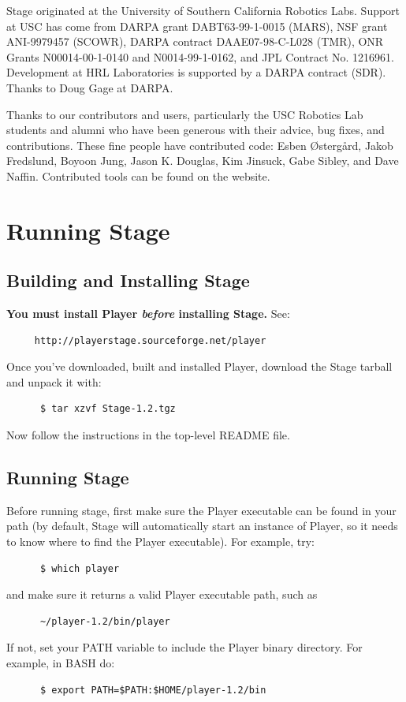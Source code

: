 \documentclass[11pt,twoside]{report}
\begin{document}
Stage originated at the University of Southern California Robotics
    Labs. Support at USC has come from DARPA grant DABT63-99-1-0015
    (MARS), NSF grant ANI-9979457 (SCOWR), DARPA contract
    DAAE07-98-C-L028 (TMR), ONR Grants N00014-00-1-0140 and
    N0014-99-1-0162, and JPL Contract No. 1216961. Development at HRL
    Laboratories is supported by a DARPA contract (SDR). Thanks to
    Doug Gage at DARPA.

Thanks to our contributors and users, particularly the USC Robotics
Lab students and alumni who have been generous with their advice, bug
fixes, and contributions. These fine people have contributed code:
Esben \O{}sterg\aa{}rd, Jakob Fredslund, Boyoon Jung, Jason
K. Douglas, Kim Jinsuck, Gabe Sibley, and Dave Naffin. Contributed
tools can be found on the website.

\chapter{Running Stage}
  \section{Building and Installing Stage}

    {\bf You must install Player {\sl before} installing Stage.} 
    See:
	\begin{verbatim}
	 http://playerstage.sourceforge.net/player
	\end{verbatim}

    \noindent Once you've downloaded, built and installed Player, download
    the Stage tarball and unpack it with:
      \begin{verbatim}
      $ tar xzvf Stage-1.2.tgz
      \end{verbatim}
    Now follow the instructions in the top-level README file.

  \section{Running Stage}

    Before running stage, first make sure the Player executable can be
    found in your path (by default, Stage will automatically start an instance of Player, so it needs to know where to find the Player executable).
    For example, try:
      \begin{verbatim}
      $ which player
      \end{verbatim}
    and make sure it returns a valid Player executable path, such as
      \begin{verbatim}
      ~/player-1.2/bin/player
      \end{verbatim}
    If not, set your PATH variable to include the Player binary directory. 
    For example, in BASH do:
      \begin{verbatim}  
      $ export PATH=$PATH:$HOME/player-1.2/bin
      \end{verbatim}  
\end{document}

